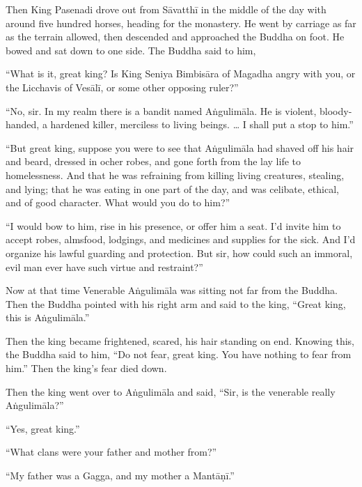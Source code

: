 \documentclass[12pt,openany]{book}%
\begin{document}
Then King Pasenadi drove out from \textsanskrit{Sāvatthī} in the middle of the day with around five hundred horses, heading for the monastery. He went by carriage as far as the terrain allowed, then descended and approached the Buddha on foot. He bowed and sat down to one side. The Buddha said to him, 

“What is it, great king? Is King Seniya \textsanskrit{Bimbisāra} of Magadha angry with you, or the Licchavis of \textsanskrit{Vesālī}, or some other opposing ruler?” 

“No, sir. In my realm there is a bandit named \textsanskrit{Aṅgulimāla}. He is violent, bloody-handed, a hardened killer, merciless to living beings. … I shall put a stop to him.” 

“But great king, suppose you were to see that \textsanskrit{Aṅgulimāla} had shaved off his hair and beard, dressed in ocher robes, and gone forth from the lay life to homelessness. And that he was refraining from killing living creatures, stealing, and lying; that he was eating in one part of the day, and was celibate, ethical, and of good character. What would you do to him?” 

“I would bow to him, rise in his presence, or offer him a seat. I’d invite him to accept robes, almsfood, lodgings, and medicines and supplies for the sick. And I’d organize his lawful guarding and protection. But sir, how could such an immoral, evil man ever have such virtue and restraint?” 

Now at that time Venerable \textsanskrit{Aṅgulimāla} was sitting not far from the Buddha. Then the Buddha pointed with his right arm and said to the king, “Great king, this is \textsanskrit{Aṅgulimāla}.” 

Then the king became frightened, scared, his hair standing on end. Knowing this, the Buddha said to him, “Do not fear, great king. You have nothing to fear from him.” Then the king’s fear died down. 

Then the king went over to \textsanskrit{Aṅgulimāla} and said, “Sir, is the venerable really \textsanskrit{Aṅgulimāla}?” 

“Yes, great king.” 

“What clans were your father and mother from?” 

“My father was a Gagga, and my mother a \textsanskrit{Mantāṇī}.” 
\end{document}
